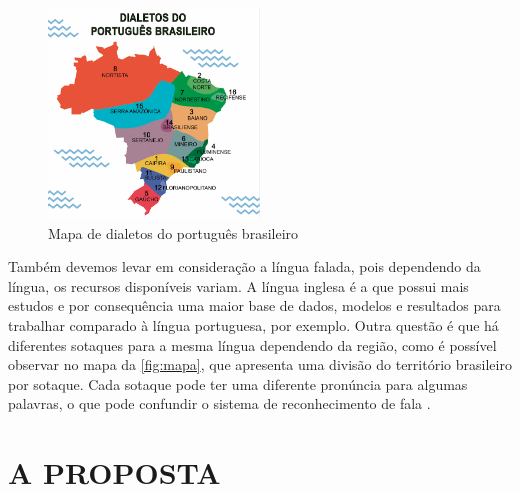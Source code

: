 \begin{figure}[h!]
\centering
\caption{Mapa de dialetos do português brasileiro}
\label{fig:mapa}
\includegraphics[width=0.5\textwidth]{images/dialeto-portugues.png}
\end{figure}

Também devemos levar em consideração a língua falada, pois dependendo da língua, os recursos disponíveis variam. A língua inglesa é a que possui mais estudos e por consequência uma maior base de dados, modelos e resultados para trabalhar comparado à língua portuguesa, por exemplo. Outra  questão é que há diferentes sotaques para a mesma língua dependendo da região, como é possível observar no mapa da \autoref{fig:mapa}, que apresenta uma divisão do território brasileiro por sotaque. Cada sotaque pode ter uma diferente pronúncia para algumas palavras, o que pode confundir o sistema de reconhecimento de fala \cite{viglino2019end}. 


\section{A PROPOSTA}


